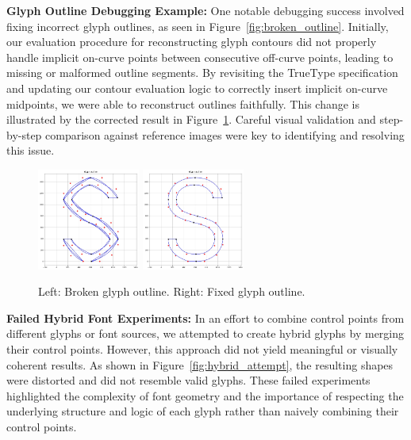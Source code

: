 \documentclass[11pt]{article}
\begin{document}
\textbf{Glyph Outline Debugging Example:} One notable debugging success involved fixing incorrect glyph outlines, as seen in Figure~\ref{fig:broken_outline}. Initially, our evaluation procedure for reconstructing glyph contours did not properly handle implicit on-curve points between consecutive off-curve points, leading to missing or malformed outline segments. By revisiting the TrueType specification and updating our contour evaluation logic to correctly insert implicit on-curve midpoints, we were able to reconstruct outlines faithfully. This change is illustrated by the corrected result in Figure~\ref{fig:fixed_outline}. Careful visual validation and step-by-step comparison against reference images were key to identifying and resolving this issue. \\

\begin{figure}[h]
    \centering
    \includegraphics[width=0.3\textwidth]{../images/glyphOutlineNotWorking.jpg}
    \includegraphics[width=0.3\textwidth]{../images/glyphOutlineFix.jpg}
    \caption{Left: Broken glyph outline. Right: Fixed glyph outline.}
    \label{fig:broken_outline}
    \label{fig:fixed_outline}
\end{figure}
\par

\textbf{Failed Hybrid Font Experiments:} In an effort to combine control points from different glyphs or font sources, we attempted to create hybrid glyphs by merging their control points. However, this approach did not yield meaningful or visually coherent results. As shown in Figure~\ref{fig:hybrid_attempt}, the resulting shapes were distorted and did not resemble valid glyphs. These failed experiments highlighted the complexity of font geometry and the importance of respecting the underlying structure and logic of each glyph rather than naively combining their control points. \\
\end{document}
